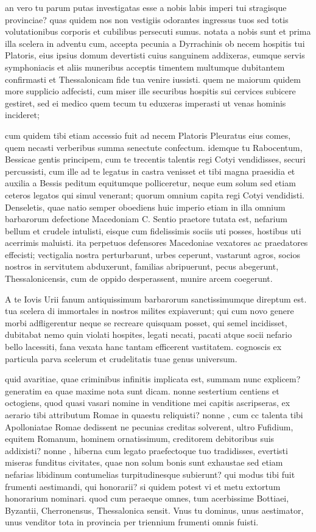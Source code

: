  an vero tu parum putas investigatas esse a nobis labis imperi tui stragisque provinciae? quas quidem nos non vestigiis odorantes ingressus tuos sed totis volutationibus corporis et cubilibus persecuti sumus. notata a nobis sunt et prima illa scelera in adventu cum, accepta pecunia a Dyrrachinis ob necem hospitis tui Platoris, eius ipsius domum devertisti cuius sanguinem addixeras, eumque servis symphoniacis et aliis muneribus acceptis timentem multumque dubitantem confirmasti et Thessalonicam fide tua venire iussisti. quem ne maiorum quidem more supplicio adfecisti, cum miser ille securibus hospitis sui cervices subicere gestiret, sed ei medico quem tecum tu eduxeras imperasti ut venas hominis incideret;

 cum quidem tibi etiam accessio fuit ad necem Platoris Pleuratus eius comes, quem necasti verberibus summa senectute confectum. idemque tu Rabocentum, Bessicae gentis principem, cum te trecentis talentis regi Cotyi vendidisses, securi percussisti, cum ille ad te legatus in castra venisset et tibi magna praesidia et auxilia a Bessis peditum equitumque polliceretur, neque eum solum sed etiam ceteros legatos qui simul venerant; quorum omnium capita regi Cotyi vendidisti. Denseletis, quae natio semper oboediens huic imperio etiam in illa omnium barbarorum defectione Macedoniam C. Sentio praetore tutata est, nefarium bellum et crudele intulisti, eisque cum fidelissimis sociis uti posses, hostibus uti acerrimis maluisti. ita perpetuos defensores Macedoniae vexatores ac praedatores effecisti; vectigalia nostra perturbarunt, urbes ceperunt, vastarunt agros, socios nostros in servitutem abduxerunt, familias abripuerunt, pecus abegerunt, Thessalonicensis, cum de oppido desperassent, munire arcem coegerunt.

 A te Iovis Urii fanum antiquissimum barbarorum sanctissimumque direptum est. tua scelera di immortales in nostros milites expiaverunt; qui cum novo genere morbi adfligerentur neque se recreare quisquam posset, qui semel incidisset, dubitabat nemo quin violati hospites, legati necati, pacati atque socii nefario bello lacessiti, fana vexata hanc tantam efficerent vastitatem. cognoscis ex particula parva scelerum et crudelitatis tuae genus universum.

 quid avaritiae, quae criminibus infinitis implicata est, summam nunc explicem? generatim ea quae maxime nota sunt dicam. nonne sestertium centiens et octogiens, quod quasi vasari nomine in venditione mei capitis ascripseras, ex aerario tibi attributum Romae in quaestu reliquisti? nonne , cum cc talenta tibi Apolloniatae Romae dedissent ne pecunias creditas solverent, ultro Fufidium, equitem Romanum, hominem ornatissimum, creditorem debitoribus suis addixisti? nonne , hiberna cum legato praefectoque tuo tradidisses, evertisti miseras funditus civitates, quae non solum bonis sunt exhaustae sed etiam nefarias libidinum contumelias turpitudinesque subierunt? qui modus tibi fuit frumenti aestimandi, qui honorarii? si quidem potest vi et metu extortum honorarium nominari. quod cum peraeque omnes, tum acerbissime Bottiaei, Byzantii, Cherronensus, Thessalonica sensit. Vnus tu dominus, unus aestimator, unus venditor tota in provincia per triennium frumenti omnis fuisti.

